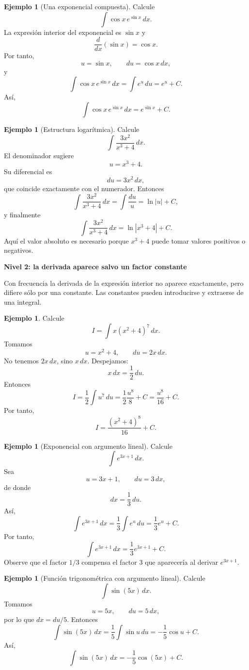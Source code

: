 \documentclass[12pt]{article}
\theoremstyle{definition}
\newtheorem{ejemplo}[teorema]{Ejemplo}
\theoremstyle{remark}
\begin{document}
\begin{ejemplo}[Una exponencial compuesta]
Calcule
\[
\int \cos x\,e^{\sin x}\,dx.
\]
La expresión interior del exponencial es $\sin x$ y
\[
\frac{d}{dx}(\sin x)=\cos x.
\]
Por tanto,
\[
u=\sin x,\qquad du=\cos x\,dx,
\]
y
\[
\int \cos x\,e^{\sin x}\,dx=\int e^u\,du=e^u+C.
\]
Así,
\[
\boxed{\int \cos x\,e^{\sin x}\,dx=e^{\sin x}+C.}
\]
\end{ejemplo}

\begin{ejemplo}[Estructura logarítmica]
Calcule
\[
\int\frac{3x^2}{x^3+4}\,dx.
\]
El denominador sugiere
\[
u=x^3+4.
\]
Su diferencial es
\[
du=3x^2\,dx,
\]
que coincide exactamente con el numerador. Entonces
\[
\int\frac{3x^2}{x^3+4}\,dx=\int\frac{du}{u}=\ln|u|+C,
\]
y finalmente
\[
\boxed{\int\frac{3x^2}{x^3+4}\,dx=\ln|x^3+4|+C.}
\]
Aquí el valor absoluto es necesario porque $x^3+4$ puede tomar valores positivos o negativos.
\end{ejemplo}

\textbf{Nivel 2: la derivada aparece salvo un factor constante}

Con frecuencia la derivada de la expresión interior no aparece exactamente, pero difiere sólo por una constante. Las constantes pueden introducirse y extraerse de una integral.

\begin{ejemplo}
Calcule
\[
I=\int x(x^2+4)^7\,dx.
\]
Tomamos
\[
u=x^2+4,\qquad du=2x\,dx.
\]
No tenemos $2x\,dx$, sino $x\,dx$. Despejamos:
\[
x\,dx=\frac12\,du.
\]
Entonces
\[
I=\frac12\int u^7\,du
=\frac12\frac{u^8}{8}+C
=\frac{u^8}{16}+C.
\]
Por tanto,
\[
\boxed{I=\frac{(x^2+4)^8}{16}+C.}
\]
\end{ejemplo}

\begin{ejemplo}[Exponencial con argumento lineal]
Calcule
\[
\int e^{3x+1}\,dx.
\]
Sea
\[
u=3x+1,\qquad du=3\,dx,
\]
de donde
\[
dx=\frac13\,du.
\]
Así,
\[
\int e^{3x+1}\,dx
=\frac13\int e^u\,du
=\frac13e^u+C.
\]
Por tanto,
\[
\boxed{\int e^{3x+1}\,dx=\frac13e^{3x+1}+C.}
\]
Observe que el factor $1/3$ compensa el factor $3$ que aparecería al derivar $e^{3x+1}$.
\end{ejemplo}

\begin{ejemplo}[Función trigonométrica con argumento lineal]
Calcule
\[
\int\sin(5x)\,dx.
\]
Tomamos
\[
u=5x,\qquad du=5\,dx,
\]
por lo que $dx=du/5$. Entonces
\[
\int\sin(5x)\,dx
=\frac15\int\sin u\,du
=-\frac15\cos u+C.
\]
Así,
\[
\boxed{\int\sin(5x)\,dx=-\frac15\cos(5x)+C.}
\]
\end{ejemplo}
\end{document}
